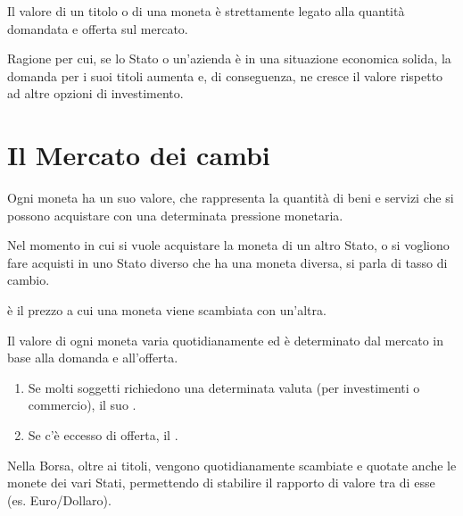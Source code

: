 \documentclass[letterpaper,10pt,italian]{sphinxmanual}
\begin{document}
\sphinxAtStartPar
{}

\sphinxAtStartPar
Il valore di un titolo o di una moneta è strettamente legato alla quantità domandata e offerta sul mercato.

\sphinxAtStartPar
Ragione per cui, se lo Stato o un’azienda è in una situazione economica solida, la domanda per i suoi titoli aumenta e,
di conseguenza, ne cresce il valore rispetto ad altre opzioni di investimento.

\sphinxstepscope


\chapter{Il Mercato dei cambi}
\label{\detokenize{Il Mercato dei cambi:il-mercato-dei-cambi}}\label{\detokenize{Il Mercato dei cambi::doc}}
\sphinxAtStartPar
Ogni moneta ha un suo valore, che rappresenta la quantità di beni e servizi che si possono acquistare con una
determinata pressione monetaria.

\sphinxAtStartPar
Nel momento in cui si vuole acquistare la moneta di un altro Stato, o si vogliono fare acquisti in uno Stato diverso che ha una moneta diversa, si parla di tasso di cambio.

\sphinxAtStartPar
{} è il prezzo a cui una moneta viene scambiata con un’altra.

\sphinxAtStartPar
{}

\sphinxAtStartPar
Il valore di ogni moneta varia quotidianamente ed è determinato dal mercato in base alla domanda e all’offerta.
\begin{enumerate}
%
\item {} 
\sphinxAtStartPar
Se molti soggetti richiedono una determinata valuta (per investimenti o commercio), il suo .

\item {} 
\sphinxAtStartPar
Se c’è eccesso di offerta, il .

\end{enumerate}

\sphinxAtStartPar
Nella Borsa, oltre ai titoli, vengono quotidianamente scambiate e quotate anche le monete dei vari Stati,
permettendo di stabilire il rapporto di valore tra di esse (es. Euro/Dollaro).



\renewcommand{\indexname}{Indice}
\printindex
\end{document}
